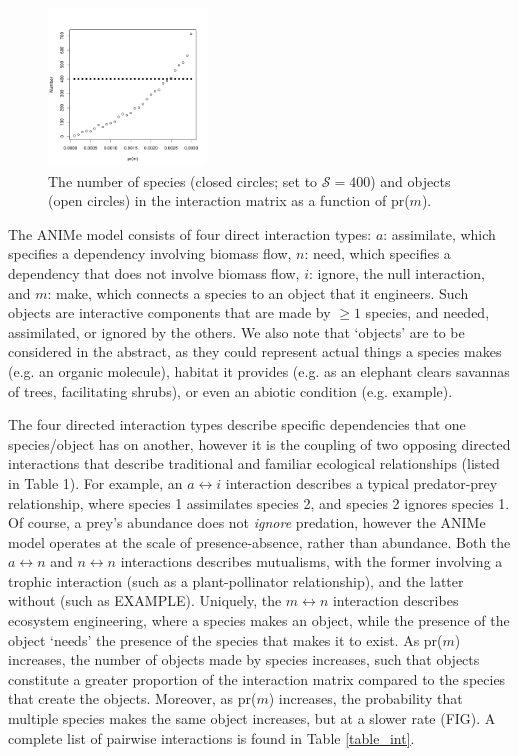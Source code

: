 \documentclass[twocolumn,preprintnumbers,amsmath,amssymb,superscriptaddress]{revtex4}
\begin{document}
\begin{figure}
\centering
\includegraphics[width=0.375\textwidth]{fig_spob.pdf}
\caption{
The number of species (closed circles; set to $\mathcal S=400$) and objects (open circles) in the interaction matrix as a function of pr($m$).
}
\label{fig_spob}
\end{figure} 


The ANIMe model consists of four direct interaction types:
$a$: assimilate, which specifies a dependency involving biomass flow,
$n$: need, which specifies a dependency that does not involve biomass flow,
$i$: ignore, the null interaction, and
$m$: make, which connects a species to an object that it engineers. Such objects are interactive components that are made by $\geq 1$ species, and needed, assimilated, or ignored by the others.
We also note that `objects' are to be considered in the abstract, as they could represent actual things a species makes (e.g. an organic molecule), habitat it provides (e.g. as an elephant clears savannas of trees, facilitating shrubs), or even an abiotic condition (e.g. example). 



The four directed interaction types describe specific dependencies that one species/object has on another, however it is the coupling of two opposing directed interactions that describe traditional and familiar ecological relationships (listed in Table 1).
For example, an $a \leftrightarrow i$ interaction describes a typical predator-prey relationship, where species 1 assimilates species 2, and species 2 ignores species 1.
Of course, a prey's abundance does not \emph{ignore} predation, however the ANIMe model operates at the scale of presence-absence, rather than abundance.
Both the $a \leftrightarrow n$ and $n \leftrightarrow n$ interactions describes mutualisms, with the former involving a trophic interaction (such as a plant-pollinator relationship), and the latter without (such as EXAMPLE).
Uniquely, the $m \leftrightarrow n$ interaction describes ecosystem engineering, where a species makes an object, while the presence of the object `needs' the presence of the species that makes it to exist.
As pr($m$) increases, the number of objects made by species increases, such that objects constitute a greater proportion of the interaction matrix compared to the species that create the objects.
Moreover, as pr($m$) increases, the probability that multiple species makes the same object increases, but at a slower rate (FIG).
A complete list of pairwise interactions is found in Table \ref{table_int}.
\end{document}
